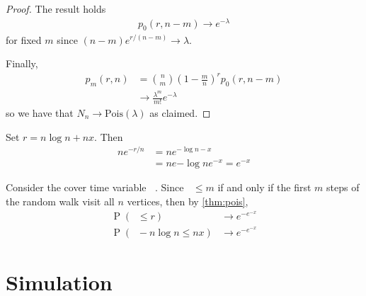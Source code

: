 \documentclass[12pt]{article}
\theoremstyle{definition}
\DeclareMathOperator{\pr}{\mathrm{P}}		     %
\DeclareMathOperator{\cov}{\uptau_\textrm{cov}}  %
\begin{document}
\begin{proof}
The result holds
\begin{align}
p_0(r,n-m) \rightarrow e^{-\lambda} \nonumber
\end{align}
for fixed $m$ since $(n-m)e^{r/(n-m)} \rightarrow \lambda$.

Finally,
\begin{align}
p_m(r,n) &= {n \choose m} (1-\frac{m}{n})^r p_0(r, n-m) \nonumber \\
&\rightarrow \frac{\lambda^m}{ m!} e^{-\lambda} \nonumber
\end{align}
so we have that $N_n \rightarrow \textrm{Pois}(\lambda)$ as claimed.

\end{proof}



Set $r = n \log n + nx$.
Then 
\begin{align}
ne^{-r/n} &= n e ^{- \log n - x} \nonumber \\
&= n e {- \log n} e^ {- x} = e^{-x}\nonumber
\end{align}

Consider the cover time variable $\cov$.
Since $\cov \leq m$ if and only if the first $m$ steps
of the random walk visit all $n$ vertices, then by \cref{thm:pois},
\begin{align}
\pr(\cov \leq r) &\rightarrow e^{-e^{-x}} \nonumber \\
\pr(\cov - n \log n\leq nx) &\rightarrow e^{-e^{-x}} \nonumber
\end{align}




\section{Simulation}

\cite{Bo98}
\cite{Gr10}

\newpage
{}

\begin{comment}
\begin{thebibliography}{9}

\bibitem{AF14}
	Aldous, D. and J. Fill.
	2014.
	\textit{Reversible Markov Chains and Random Walks on Graphs}.

\bibitem{BH94}
	Blom, G., L. Holst and D. Sandell.
	\textit{Problems and Snapshots from the World of Probability},
	Springer Science \& Business Media, 1994.

\bibitem{Bo13}
	Bollobás, B.
	2013.
	\textit{Modern Graph Theory},
	Vol. 184,
	Springer Science \& Business Media.

\bibitem{DS84}
	Doyle, P. G. and J. L. Snell.
	1984.
	\textit{Random Walks and Electric Networks},
	Mathematical Association of America.
 
\bibitem{Gr10}
	Grimmett, G.
	2010.
	\textit{Probability on Graphs : Random Processes on Graphs and Lattices},
	Vol. 8,
	Cambridge University Press.

\bibitem{LP08}
	Levin, D. A. and Y. Peres.
	2017.
	\textit{Markov Chains and Mixing Times},
	Vol. 107,
	American Mathematical Society.

\end{thebibliography}
\end{comment}
\end{document}
